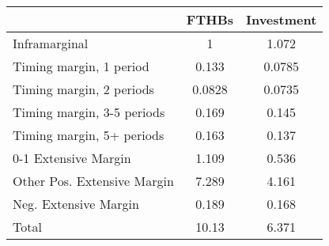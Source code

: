 \begin{tabular}{l*{2}{c}}
\hline\hline
            &       FTHBs&  Investment\\
\hline
Inframarginal&           1&       1.072\\
Timing margin, 1 period&       0.133&      0.0785\\
Timing margin, 2 periods&      0.0828&      0.0735\\
Timing margin, 3-5 periods&       0.169&       0.145\\
Timing margin, 5+ periods&       0.163&       0.137\\
0-1 Extensive Margin&       1.109&       0.536\\
Other Pos. Extensive Margin&       7.289&       4.161\\
Neg. Extensive Margin&       0.189&       0.168\\
Total       &       10.13&       6.371\\
\hline\hline
\end{tabular}
